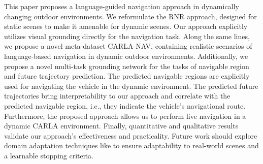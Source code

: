 \documentclass[letterpaper, 10 pt, conference]{ieeeconf}  %
\begin{document}
This paper proposes a language-guided navigation approach in dynamically changing outdoor environments. We reformulate the RNR approach, designed for static scenes to make it amenable for dynamic scenes. Our approach explicitly utilizes visual grounding directly for the navigation task. Along the same lines, we propose a novel meta-dataset CARLA-NAV, containing realistic scenarios of language-based navigation in dynamic outdoor environments. Additionally, we propose a novel multi-task grounding network for the tasks of navigable region and future trajectory prediction. The predicted navigable regions are explicitly used for navigating the vehicle in the dynamic environment. The predicted future trajectories bring interpretability to our approach and correlate with the predicted navigable region, i.e., they indicate the vehicle's navigational route. Furthermore, the proposed approach allows us to perform live navigation in a dynamic CARLA environment. Finally, quantitative and qualitative results validate our approach's effectiveness and practicality. Future work should explore domain adaptation techniques like \cite{kundu2021generalize, kang2020pixel} to ensure adaptability to real-world scenes and a learnable stopping criteria.







\end{document}
